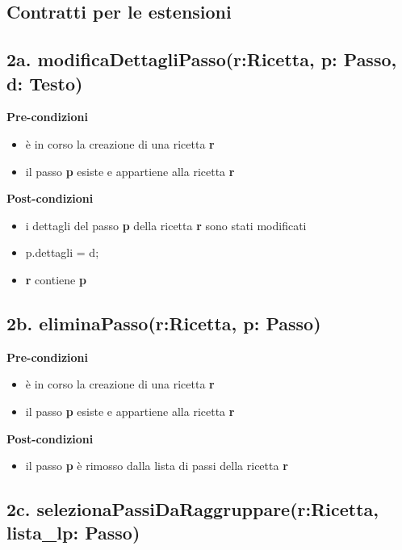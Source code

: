\documentclass[12pt]{extarticle}
\begin{document}
\newpage
\begin{center}
  \section*{Contratti per le estensioni}
\end{center}

\subsection*{2a. modificaDettagliPasso(r:Ricetta, p: Passo, d: Testo)}

\textbf{Pre-condizioni}
\begin{itemize}
  \item è in corso la creazione di una ricetta  \textbf{r}
  \item il passo  \textbf{p} esiste e appartiene alla ricetta \textbf{r}
\end{itemize}
\textbf{Post-condizioni}
\begin{itemize}
  \item i dettagli del passo \textbf{p} della ricetta \textbf{r} sono stati modificati
  \item p.dettagli = d;
  \item  \textbf{r} contiene  \textbf{p}
\end{itemize}

\subsection*{2b. eliminaPasso(r:Ricetta, p: Passo)}

\textbf{Pre-condizioni}
\begin{itemize}
  \item è in corso la creazione di una ricetta  \textbf{r}
  \item il passo  \textbf{p} esiste e appartiene alla ricetta \textbf{r}
\end{itemize}
\textbf{Post-condizioni}
\begin{itemize}
  \item il passo  \textbf{p} è rimosso dalla lista di passi della ricetta \textbf{r}
\end{itemize}

\subsection*{2c. selezionaPassiDaRaggruppare(r:Ricetta, lista\_lp: Passo)}
\end{document}
